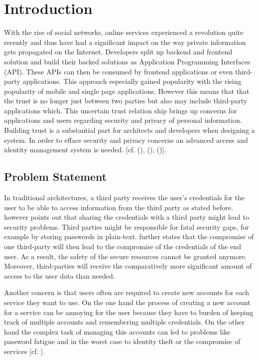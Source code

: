 \chapter{Introduction}\label{chap:introduction}
\chapterstart

With the rise of social networks, online services experienced a revolution quite recently and thus have had a significant impact on the way private information gets propagated on the Internet. Developers split up backend and frontend solution and build their backed solutions as Application Programming Interfaces (API). These APIs can then be consumed by frontend applications or even third-party applications. This approach especially gained popularity with the rising popularity of mobile and single page applications. However this means that that the trust is no longer just between two parties but also may include third-party applications which. This uncertain trust relation ship brings up concerns for applications and users regarding security and privacy of personal information. Building trust is a substantial part for architects and developers when designing a system. In order to efface security and privacy concerns an advanced access and identity management system is needed. [cf. (\cite{Cirani:OBAS}), (\cite{Tkalec:2015}), (\cite{Rossvoll:2013:RUBIM})].

 


\section{Problem Statement}

In traditional architectures, a third party receives the user’s credentials for the user to be able to access information from the third party as stated before. \cite{Prasad:MMWPT} however points out that sharing the credentials with a third party might lead to security problems. Third parties might be responsible for fatal security gaps, for example by storing passwords in plain-text. \cite{Prasad:MMWPT} further states that the compromise of one third-party will then lead to the compromise of the credentials of the end user. As a result, the safety of the secure resources cannot be granted anymore. Moreover, third-parties will receive the comparatively more significant amount of access to the user data than needed.

Another concern is that users often are required to create new accounts for each service they want to use. On the one hand the process of creating a new account for a service can be annoying for the user because they have to burden of keeping track of multiple accounts and remembering multiple credentials. On the other hand the complex task of managing this accounts can led to problems like password fatigue and in the worst case to identity theft or the compromise of services [cf. \cite{Sakimura:OIDCC}].



